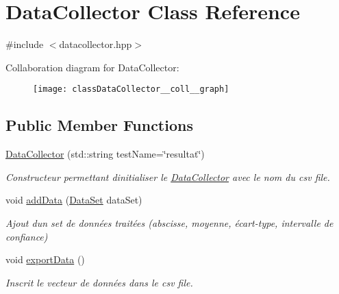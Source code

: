 \hypertarget{classDataCollector}{}\section{Data\+Collector Class Reference}
\label{classDataCollector}


{\ttfamily \#include $<$datacollector.\+hpp$>$}



Collaboration diagram for Data\+Collector\+:
\nopagebreak
\begin{figure}[H]
\begin{center}
\leavevmode
\texttt{[image: classDataCollector\_\_coll\_\_graph]}
\end{center}
\end{figure}
\subsection*{Public Member Functions}
\begin{DoxyCompactItemize}
\item 
\hyperlink{classDataCollector_a8061e46d6301b7a766bd628472353b44}{Data\+Collector} (std\+::string test\+Name=\char`\"{}resultat\char`\"{})
\begin{DoxyCompactList}\small\item\em Constructeur permettant d\textquotesingle{}initialiser le \hyperlink{classDataCollector}{Data\+Collector} avec le nom du csv file. \end{DoxyCompactList}\item 
void \hyperlink{classDataCollector_ac0d50d38e3a5107541f929d4ea3a8cb5}{add\+Data} (\hyperlink{classDataSet}{Data\+Set} data\+Set)
\begin{DoxyCompactList}\small\item\em Ajout d\textquotesingle{}un set de données traitées (abscisse, moyenne, écart-\/type, intervalle de confiance) \end{DoxyCompactList}\item 
void \hyperlink{classDataCollector_a6af99e22f24d045d607cb708866b9ce2}{export\+Data} ()
\begin{DoxyCompactList}\small\item\em Inscrit le vecteur de données dans le csv file. \end{DoxyCompactList}\end{DoxyCompactItemize}
